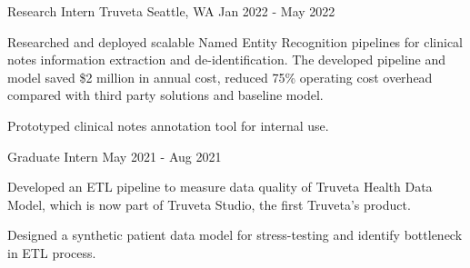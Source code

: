 \begin{cventries}
	\vspace{-1mm}

	\cventry
	{Research Intern}
	{Truveta}
	{Seattle, WA}
	{Jan 2022 - May 2022}
	{\begin{cvitems}
			\item {Researched and deployed scalable Named Entity Recognition pipelines for clinical notes information extraction and de-identification. The developed pipeline and model saved \$2 million in annual cost, reduced 75\% operating cost overhead compared with third party solutions and baseline model.}
			\item {Prototyped clinical notes annotation tool for internal use.}
		\end{cvitems}}

	\vspace{-2mm}

	\cventry
	{Graduate Intern}
	{}
	{}
	{May 2021 - Aug 2021}
	{\begin{cvitems}
			\item {Developed an ETL pipeline to measure data quality of Truveta Health Data Model, which is now part of Truveta Studio, the first Truveta's product.}
			\item {Designed a synthetic patient data model for stress-testing and identify bottleneck in ETL process.}
		\end{cvitems}}

\end{cventries}